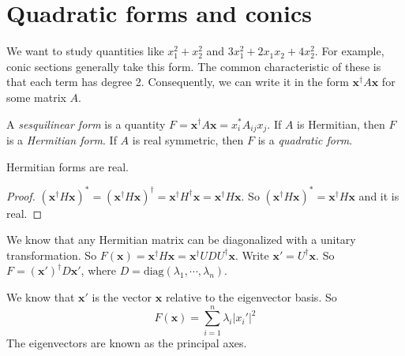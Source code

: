 \documentclass[a4paper]{article}
\begin{document}
\section{Quadratic forms and conics}
We want to study quantities like $x_1^2 + x_2^2$ and $3x_1^2 + 2x_1x_2 + 4x_2^2$. For example, conic sections generally take this form. The common characteristic of these is that each term has degree 2. Consequently, we can write it in the form $\mathbf{x}^\dagger A\mathbf{x}$ for some matrix $A$.

\begin{defi}
  A \emph{sesquilinear form} is a quantity $F = \mathbf{x}^\dagger A\mathbf{x} = x_i^*A_{ij}x_j$. If $A$ is Hermitian, then $F$ is a \emph{Hermitian form}. If $A$ is real symmetric, then $F$ is a \emph{quadratic form}.
\end{defi}

\begin{thm}
  Hermitian forms are real.
\end{thm}
\begin{proof}
  $(\mathbf{x}^\dagger H\mathbf{x})^* = (\mathbf{x}^\dagger H\mathbf{x})^\dagger = \mathbf{x}^\dagger H^\dagger\mathbf{x} = \mathbf{x}^\dagger H\mathbf{x}$. So $(\mathbf{x}^\dagger H\mathbf{x})^* = \mathbf{x}^\dagger H\mathbf{x}$ and it is real.
\end{proof}

We know that any Hermitian matrix can be diagonalized with a unitary transformation. So $F(\mathbf{x}) = \mathbf{x}^\dagger H\mathbf{x} = \mathbf{x}^\dagger UDU^\dagger \mathbf{x}$. Write $\mathbf{x}' = U^\dagger \mathbf{x}$. So $F = (\mathbf{x}')^\dagger D\mathbf{x}'$, where $D = \mathrm{diag}(\lambda_1,\cdots,\lambda_n)$.

We know that $\mathbf{x}'$ is the vector $\mathbf{x}$ relative to the eigenvector basis. So
\[
  F(\mathbf{x}) = \sum_{i = 1}^n \lambda_i |x_i'|^2
\]
The eigenvectors are known as the principal axes.
\end{document}
